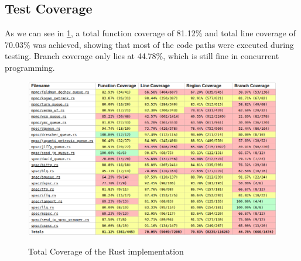 \subsection{Test Coverage}
As we can see in \cref{fig:cov}, a total function coverage of 81.12\% and total line coverage of 70.03\% was achieved, showing that most of the code paths were executed during testing. Branch coverage only lies at 44.78\%, which is still fine in concurrent programming.
\begin{figure}[!ht]
    \centering
    \captionsetup{justification=centering}
    \caption{Total Coverage of the Rust implementation}
    \includegraphics[width=145mm]{images/coverage.png}
    \label{fig:cov}
\end{figure}